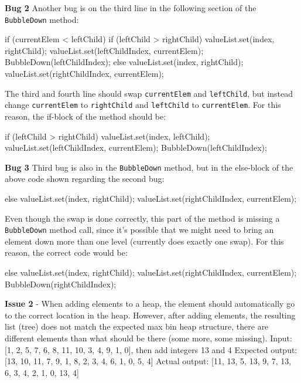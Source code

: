 \documentclass[11pt]{article}
\begin{document}
\hfill\begin{minipage}{\dimexpr\textwidth-0.5cm}
\textbf{Bug 2}
\newline
Another bug is on the third line in the following section of the \verb/BubbleDown/ method:
\begin{javacode}
    if (currentElem < leftChild) {
        if (leftChild > rightChild) {
            valueList.set(index, rightChild);
            valueList.set(leftChildIndex, currentElem);
            BubbleDown(leftChildIndex);
        } else {
            valueList.set(index, rightChild);
            valueList.set(rightChildIndex, currentElem);
        }
    }
\end{javacode}
The third and fourth line should swap \verb/currentElem/ and \verb/leftChild/, but instead change \verb/currentElem/ to \verb/rightChild/ and \verb/leftChild/ to \verb/currentElem/. For this reason, the if-block of the method should be:
\begin{javacode}
    if (leftChild > rightChild) {
        valueList.set(index, leftChild);
        valueList.set(leftChildIndex, currentElem);
        BubbleDown(leftChildIndex);
    }
\end{javacode}
\end{minipage}

\hfill\begin{minipage}{\dimexpr\textwidth-0.5cm}
\textbf{Bug 3}
\newline
Third bug is also in the \verb/BubbleDown/ method, but in the else-block of the above code shown regarding the second bug:
\begin{javacode}
    else {
        valueList.set(index, rightChild);
        valueList.set(rightChildIndex, currentElem);
    }
\end{javacode}
Even though the swap is done correctly, this part of the method is missing a \verb/BubbleDown/ method call, since it's possible that we might need to bring an element down more than one level (currently does exactly one swap). For this reason, the correct code would be:
\begin{javacode}
    else {
        valueList.set(index, rightChild);
        valueList.set(rightChildIndex, currentElem);
        BubbleDown(rightChildIndex);
    }
\end{javacode}
\end{minipage}


\textbf{Issue 2} - When adding elements to a heap, the element should automatically go to the correct location in the heap. However, after adding elements, the resulting list (tree) does not match the expected max bin heap structure, there are different elements than what should be there (some more, some missing).
\newline
Input: [1, 2, 5, 7, 6, 8, 11, 10, 3, 4, 9, 1, 0], then add integers 13 and 4
\newline
Expected output: [13, 10, 11, 7, 9, 1, 8, 2, 3, 4, 6, 1, 0, 5, 4]
\newline
Actual output: [11, 13, 5, 13, 9, 7, 13, 6, 3, 4, 2, 1, 0, 13, 4]
\end{document}
